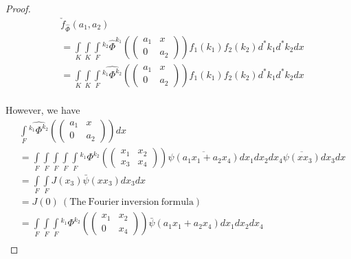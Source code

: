 \begin{proof}
\begin{equation*}
\begin{split}
&\check f_{\widehat \Phi}(a_1,a_2)\\
&={\int \limits _ K\int\limits _K \int\limits _F} {^{k_2}\widehat \Phi^{k_1}} \left ( \left( \begin{array}{cc}
a_1 & x\\
0 & a_2
\end{array}
\right )\right )f_1(k_1)f_2(k_2)d^*k_1d^*k_2dx\\
&=\int \limits _ K\int\limits _K \int\limits _F \widehat {^{k_1}\Phi^{k_2}} \left ( \left( \begin{array}{cc}
a_1 & x\\
0 & a_2
\end{array}
\right )\right )f_1(k_1)f_2(k_2)d^*k_1d^*k_2dx\\
\end{split}
\end{equation*}

However, we have
\begin{equation*}
\begin{split}
&\int\limits_F\widehat {^{k_1}\Phi^{k_2}} \left ( \left( \begin{array}{cc}
a_1 & x\\
0 & a_2
\end{array}
\right )\right )dx\\
&=\int\limits_F\int\limits_F \int\limits_F\int\limits_F\int\limits_F{^{k_1}\Phi^{k_2}} \left ( \left( \begin{array}{cc}
x_1 & x_2\\
x_3 & x_4
\end{array}
\right )\right )\overline{\psi(a_1x_1+a_2x_4)} dx_1dx_2dx_4\overline {\psi(xx_3)}dx_3dx\\
&=\int\limits_F\int\limits_F J(x_3)\bar \psi(xx_3)dx_3dx\\
&= J(0)\ ( \mathrm {The \ Fourier \ inversion \ formula})\\
&= \int\limits_F\int\limits_F\int\limits_F{^{k_1}\Phi^{k_2}} \left ( \left( \begin{array}{cc}
x_1 & x_2\\
0 & x_4
\end{array}
\right )\right )\bar\psi(a_1x_1+a_2x_4) dx_1dx_2dx_4\\
\end{split}
\end{equation*}


\end{proof}

